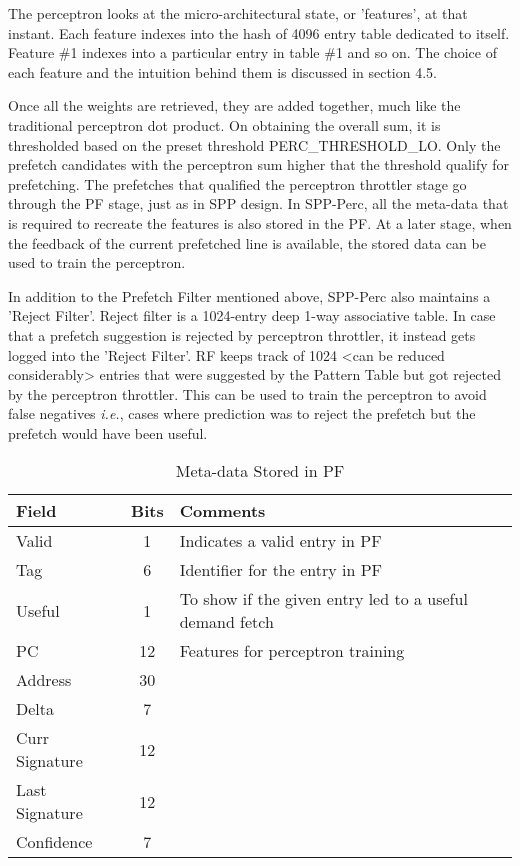\documentclass{sig-alternate}
\begin{document}
The perceptron looks at the micro-architectural state, or 'features', at that instant. Each feature indexes into the hash of 4096 entry table dedicated to itself. Feature \#1 indexes into a particular entry in table \#1 and so on. The choice of each feature and the intuition behind them is discussed in section 4.5.

Once all the weights are retrieved, they are added together, much like the traditional perceptron dot product. On obtaining the overall sum, it is thresholded based on the preset threshold PERC\_THRESHOLD\_LO. Only the prefetch candidates with the perceptron sum higher that the threshold qualify for prefetching. The prefetches that qualified the perceptron throttler stage go through the PF stage, just as in SPP design. In SPP-Perc, all the meta-data that is required to recreate the features is also stored in the PF. At a later stage, when the feedback of the current prefetched line is available, the stored data can be used to train the perceptron. 

In addition to the Prefetch Filter mentioned above, SPP-Perc also maintains a 'Reject Filter'. Reject filter is a 1024-entry deep 1-way associative table. In case that a prefetch suggestion is rejected by perceptron throttler, it instead gets logged into the 'Reject Filter'. RF keeps track of 1024 <can be reduced considerably> entries that were suggested by the Pattern Table but got rejected by the perceptron throttler. This can be used to train the perceptron to avoid false negatives \textit{i.e.}, cases where prediction was to reject the prefetch but the prefetch would have been useful.
\begin{table}[]
    \centering
    \begin{tabular}{|l|c|p{4.6cm}|}
    \hline
    Field &
    Bits &
    Comments \\
    \hline
         Valid & 1 & Indicates a valid entry in PF\\
         Tag & 6 & Identifier for the entry in PF\\
         Useful & 1 & To show if the given entry led to a useful demand fetch\\
         PC & 12 & Features for perceptron training \\
         Address & 30 & \\
         Delta & 7 & \\
         Curr Signature & 12 & \\
         Last Signature & 12 & \\
         Confidence & 7 & \\
    \hline
    \end{tabular}
    \caption{Meta-data Stored in PF}
    \label{tab:PF_metadata}
\end{table}
\end{document}
